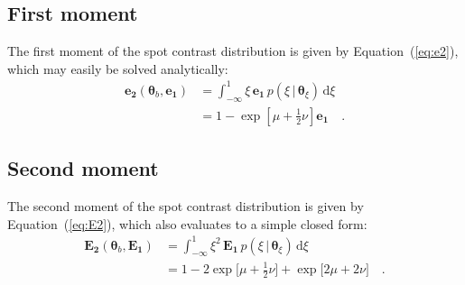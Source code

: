 \documentclass[modern]{aastex62}
\begin{document}
\subsection{First moment}
\label{sec:contrast-mom1}
The first moment of the spot contrast distribution is given by
Equation~(\ref{eq:e2}), which may easily be solved analytically:
%
\begin{align}
    \mathbf{e_2}(\pmb{\theta}_b, \mathbf{e_1})
     & =
    \int_{-\infty}^1
    \xi \,
    \mathbf{e_1} \,
    p(\xi \, \big| \, \pmb{\theta}_{\xi}) \,
    \mathrm{d}\xi
    \nonumber
    \\
     & =
    1 - \exp\left[ \mu + \frac{1}{2}\nu\right] \mathbf{e_1}
    \quad.
\end{align}
%

\subsection{Second moment}
\label{sec:contrast-mom2}
The second moment of the spot contrast distribution is given by
Equation~(\ref{eq:E2}), which also evaluates to a simple closed form:
%
\begin{align}
    \mathbf{E_2}(\pmb{\theta}_b, \mathbf{E_1})
     & =
    \int_{-\infty}^1
    \xi^2 \,
    \mathbf{E_1} \,
    p(\xi \, \big| \, \pmb{\theta}_{\xi}) \,
    \mathrm{d}\xi
    \nonumber
    \\
     & =
    1 - 2\exp\bigg[ \mu + \frac{1}{2}\nu\bigg]
    + \exp\bigg[ 2\mu + 2\nu\bigg]
    \quad.
\end{align}




\end{document}
